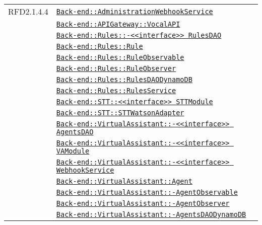 \begin{longtable}{|>{\centering}m{3cm}|m{10cm}<{\centering}|}
RFD2.1.4.4 & \hyperref[Back-end::AdministrationWebhookService]{\texttt{Back-end::AdministrationWebhookService}}\\
& \hyperref[Back-end::APIGateway::VocalAPI]{\texttt{Back-end::APIGateway::VocalAPI}}\\
& \hyperref[Back-end::Rules::<<interface>> RulesDAO]{\texttt{Back-end::Rules::-\linebreak <<interface>> RulesDAO}}\\
& \hyperref[Back-end::Rules::Rule]{\texttt{Back-end::Rules::Rule}}\\
& \hyperref[Back-end::Rules::RuleObservable]{\texttt{Back-end::Rules::RuleObservable}}\\
& \hyperref[Back-end::Rules::RuleObserver]{\texttt{Back-end::Rules::RuleObserver}}\\
& \hyperref[Back-end::Rules::RulesDAODynamoDB]{\texttt{Back-end::Rules::RulesDAODynamoDB}}\\
& \hyperref[Back-end::Rules::RulesService]{\texttt{Back-end::Rules::RulesService}}\\
& \hyperref[Back-end::STT::<<interface>> STTModule]{\texttt{Back-end::STT::<<interface>> STTModule}}\\
& \hyperref[Back-end::STT::STTWatsonAdapter]{\texttt{Back-end::STT::STTWatsonAdapter}}\\
& \hyperref[Back-end::VirtualAssistant::<<interface>> AgentsDAO]{\texttt{Back-end::VirtualAssistant::-\linebreak <<interface>> AgentsDAO}}\\
& \hyperref[Back-end::VirtualAssistant::<<interface>> VAModule]{\texttt{Back-end::VirtualAssistant::-\linebreak <<interface>> VAModule}}\\
& \hyperref[Back-end::VirtualAssistant::<<interface>> WebhookService]{\texttt{Back-end::VirtualAssistant::-\linebreak <<interface>> WebhookService}}\\
& \hyperref[Back-end::VirtualAssistant::Agent]{\texttt{Back-end::VirtualAssistant::Agent}}\\
& \hyperref[Back-end::VirtualAssistant::AgentObservable]{\texttt{Back-end::VirtualAssistant::-\linebreak AgentObservable}}\\
& \hyperref[Back-end::VirtualAssistant::AgentObserver]{\texttt{Back-end::VirtualAssistant::-\linebreak AgentObserver}}\\
& \hyperref[Back-end::VirtualAssistant::AgentsDAODynamoDB]{\texttt{Back-end::VirtualAssistant::-\linebreak AgentsDAODynamoDB}}\\

\end{longtable}
